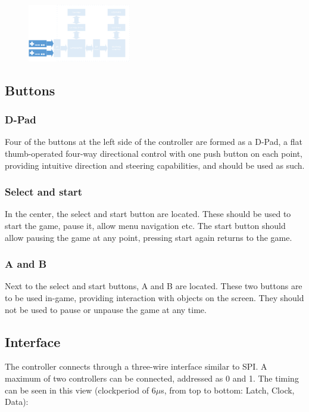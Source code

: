 		\begin{figure}[H]
			\centering
			\includegraphics[width=0.4\textwidth]{GameConsole/Controllers_overview.PNG}
			\label{fig:ControllerOverview}
		\end{figure}

	\subsection{Buttons}
		\subsubsection{D-Pad}
			\par Four of the buttons at the left side of the controller are formed as a D-Pad, a flat thumb-operated four-way directional control with one push button on each point,
			providing intuitive direction and steering capabilities, and should be used as such.

		\subsubsection{Select and start}
			\par In the center, the select and start button are located.
			These should be used to start the game, pause it, allow menu navigation etc.
			The start button should allow pausing the game at any point, pressing start again returns to the game.

		\subsubsection{A and B}
			\par Next to the select and start buttons, A and B are located.
			These two buttons are to be used in-game, providing interaction with objects on the screen.
			They should not be used to pause or unpause the game at any time.

	\subsection{Interface}
		\par The controller connects through a three-wire interface similar to SPI. A maximum of two controllers can be connected, addressed as 0 and 1. The timing can be seen in this view (clockperiod of 6$\mu$s, from top to bottom: Latch, Clock, Data):

